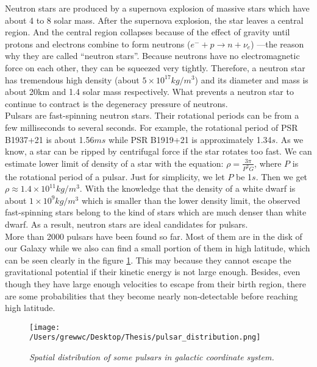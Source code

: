 \documentclass[12pt]{report}
\begin{document}
        Neutron stars are produced by a supernova explosion of massive stars which have about 4 to 8 
        solar mass. After 
        the supernova explosion, the star leaves a central region. And the central region collapses because 
        of the effect of 
        gravity until protons and electrons combine to form neutrons ($e^{-}+p\rightarrow n+\nu_{e}$)
        ---the reason why they are called 
        ``neutron stars''.  
        Because neutrons have no electromagnetic force on each other, they can be squeezed very tightly. 
        Therefore, a neutron  
        star has tremendous high density (about $5\times 10^{17} kg/m^3$) and its diameter and mass is about
        20km and 
        1.4 solar mass respectively. What
        prevents a neutron star to continue to contract is the degeneracy pressure of neutrons. \\
        \indent Pulsars are fast-spinning neutron stars. Their rotational periods can be from a few 
        milliseconds
        to several seconds. For example, the rotational period of PSR B1937+21 is about 1.56$ms$ while 
        PSR B1919+21 is approximately 1.34$s$. As we know, a star can be ripped by centrifugal force if the
        star rotates too fast. We can estimate lower limit of density of a star with the equation: 
        $\rho=\frac{3\pi}{P^2G}$, where $P$ is the rotational period of a pulsar. Just for simplicity, we
        let $P$ be 1$s$. Then we get $\rho\approx 1.4\times 10^{11}kg/m^3$. With the knowledge  that the 
        density of a white dwarf is about $1\times 10^9kg/m^3$ which is smaller than the lower density limit,
        the observed fast-spinning stars belong to the kind of stars which are much denser 
        than white dwarf. As a result, neutron stars are ideal candidates for pulsars. \\
        \indent 
        More than 2000 pulsars have been found so far. Most of them are in the disk of our Galaxy while we also can 
        find a small portion of them in high latitude, which can be seen clearly in the figure 
        \ref{fig:spatial distribution}. This may 
        because they cannot escape the gravitational potential if their kinetic energy is not large enough. Besides,
        even though they have large enough velocities to escape from their birth region, there are some 
        probabilities that they become nearly non-detectable before reaching high latitude. 
        
        \begin{figure}[h]
          \centering
          \texttt{[image: /Users/grewwc/Desktop/Thesis/pulsar\_distribution.png]}
          \caption{\textit{\footnotesize Spatial distribution of some pulsars in galactic coordinate system.}}
          \label{fig:spatial distribution}
        \end{figure}
        
\end{document}
